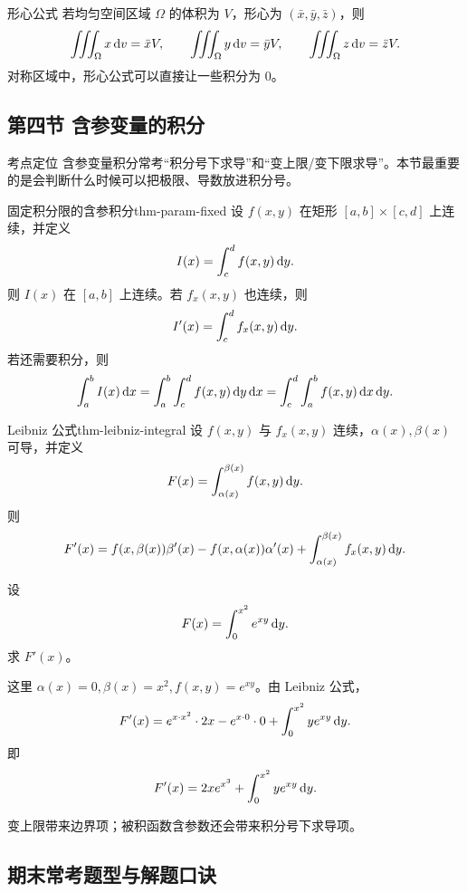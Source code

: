 \begin{summarybox}{形心公式}
若均匀空间区域 $\Omega$ 的体积为 $V$，形心为 $(\bar x,\bar y,\bar z)$，则
\[
  \iiint_\Omega x\mathop{}\!\mathrm{d} v=\bar x V,\qquad
  \iiint_\Omega y\mathop{}\!\mathrm{d} v=\bar y V,\qquad
  \iiint_\Omega z\mathop{}\!\mathrm{d} v=\bar z V.
\]
对称区域中，形心公式可以直接让一些积分为 $0$。
\end{summarybox}

\subsection{第四节 含参变量的积分}

\begin{summarybox}{考点定位}
含参变量积分常考“积分号下求导”和“变上限/变下限求导”。本节最重要的是会判断什么时候可以把极限、导数放进积分号。
\end{summarybox}

\begin{dl}{固定积分限的含参积分}{thm-param-fixed}
设 $f(x,y)$ 在矩形 $[a,b]\times[c,d]$ 上连续，并定义
\[
  I(x)=\int_c^d f(x,y)\mathop{}\!\mathrm{d} y.
\]
则 $I(x)$ 在 $[a,b]$ 上连续。若 $f_x(x,y)$ 也连续，则
\[
  I'(x)=\int_c^d f_x(x,y)\mathop{}\!\mathrm{d} y.
\]
若还需要积分，则
\[
  \int_a^b I(x)\mathop{}\!\mathrm{d} x
  =\int_a^b\int_c^d f(x,y)\mathop{}\!\mathrm{d} y\mathop{}\!\mathrm{d} x
  =\int_c^d\int_a^b f(x,y)\mathop{}\!\mathrm{d} x\mathop{}\!\mathrm{d} y.
\]
\end{dl}

\begin{dl}{Leibniz 公式}{thm-leibniz-integral}
设 $f(x,y)$ 与 $f_x(x,y)$ 连续，$\alpha(x),\beta(x)$ 可导，并定义
\[
  F(x)=\int_{\alpha(x)}^{\beta(x)} f(x,y)\mathop{}\!\mathrm{d} y.
\]
则
\[
  F'(x)=f(x,\beta(x))\beta'(x)-f(x,\alpha(x))\alpha'(x)
  +\int_{\alpha(x)}^{\beta(x)} f_x(x,y)\mathop{}\!\mathrm{d} y.
\]
\end{dl}

\begin{problem}
设
\[
  F(x)=\int_0^{x^2} e^{xy}\mathop{}\!\mathrm{d} y.
\]
求 $F'(x)$。
\end{problem}
\begin{solution}
这里 $\alpha(x)=0,\beta(x)=x^2,f(x,y)=e^{xy}$。由 Leibniz 公式，
\[
  F'(x)=e^{x\cdot x^2}\cdot 2x-e^{x\cdot0}\cdot0
  +\int_0^{x^2} y e^{xy}\mathop{}\!\mathrm{d} y.
\]
即
\[
  F'(x)=2x e^{x^3}+\int_0^{x^2} y e^{xy}\mathop{}\!\mathrm{d} y.
\]
\end{solution}
\begin{note}
变上限带来边界项；被积函数含参数还会带来积分号下求导项。
\end{note}

\subsection{期末常考题型与解题口诀}

